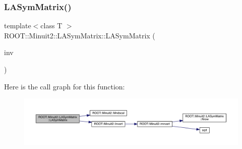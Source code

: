 \mbox{\label{classROOT_1_1Minuit2_1_1LASymMatrix_a0089b4055d0d08767d7072657b6f87d5}} 
\subsubsection{\texorpdfstring{LASymMatrix()}{LASymMatrix()}\hspace{0.1cm}{\footnotesize\ttfamily [7/20]}}
{\footnotesize\ttfamily template$<$class T $>$ \\
R\+O\+O\+T\+::\+Minuit2\+::\+L\+A\+Sym\+Matrix\+::\+L\+A\+Sym\+Matrix (\begin{DoxyParamCaption}\item[{const \mbox{\hyperlink{classROOT_1_1Minuit2_1_1ABObj}{A\+B\+Obj}}$<$ \mbox{\hyperlink{classROOT_1_1Minuit2_1_1sym}{sym}}, \mbox{\hyperlink{classROOT_1_1Minuit2_1_1MatrixInverse}{Matrix\+Inverse}}$<$ \mbox{\hyperlink{classROOT_1_1Minuit2_1_1sym}{sym}}, \mbox{\hyperlink{classROOT_1_1Minuit2_1_1ABObj}{A\+B\+Obj}}$<$ \mbox{\hyperlink{classROOT_1_1Minuit2_1_1sym}{sym}}, \mbox{\hyperlink{classROOT_1_1Minuit2_1_1LASymMatrix}{L\+A\+Sym\+Matrix}}, T $>$, T $>$, T $>$ \&}]{inv }\end{DoxyParamCaption})\hspace{0.3cm}{\ttfamily [inline]}}

Here is the call graph for this function\+:
\nopagebreak
\begin{figure}[H]
\begin{center}
\leavevmode
\includegraphics[width=350pt]{d3/d72/classROOT_1_1Minuit2_1_1LASymMatrix_a0089b4055d0d08767d7072657b6f87d5_cgraph}
\end{center}
\end{figure}
\mbox{\label{classROOT_1_1Minuit2_1_1LASymMatrix_a50ecd9916b1ca8941c767d16dbdb9b65}} 
